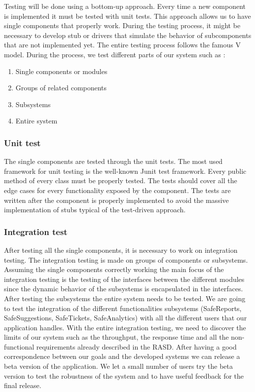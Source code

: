 \documentclass[./main.tex]{subfiles}
\begin{document}
Testing will be done using a bottom-up approach. Every time a new component is implemented it must be tested with unit tests. This approach allows us to have single components that properly work. During the testing process, it might be necessary to develop stub or drivers that simulate the behavior of subcomponents that are not implemented yet. The entire testing process follows the famous V model. During the process, we test different parts of our system such as :

\begin{enumerate}
\item Single components or modules
\item Groups of related components
\item Subsystems
\item Entire system
\end{enumerate}


\subsubsection{Unit test}
The single components are tested through the unit tests. The most used framework for unit testing is the well-known Junit test framework. Every public method of every class must be properly tested. The tests should cover all the edge cases for every functionality exposed by the component. The tests are written after the component is properly implemented to avoid the massive implementation of stubs typical of the test-driven approach.

\subsubsection{Integration test}
After testing all the single components, it is necessary to work on integration testing. The integration testing is made on groups of components or subsystems. Assuming the single components correctly working the main focus of the integration testing is the testing of the interfaces between the different modules since the dynamic behavior of the subsystems is encapsulated in the interfaces.\medskip\\
After testing the subsystems the entire system needs to be tested. We are going to test the integration of the different functionalities subsystems (SafeReports, SafeSuggestions, SafeTickets, SafeAnalytics) with all the different users that our application handles. With the entire integration testing, we need to discover the limits of our system such as the throughput, the response time and all the non-functional requirements already described in the RASD. After having a good correspondence between our goals and the developed systems we can release a beta version of the application. We let a small number of users try the beta version to test the robustness of the system and to have useful feedback for the final release.
\end{document}
